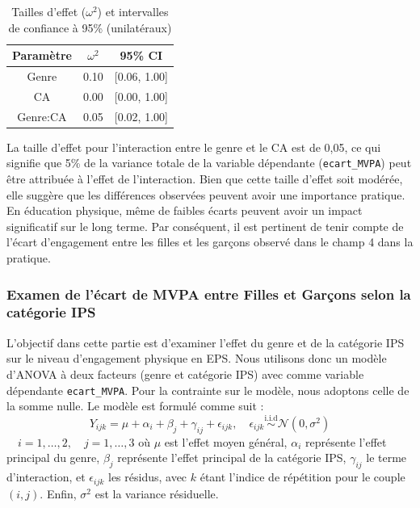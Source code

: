 \documentclass[12pt,a4paper]{article}
\begin{document}
\begin{enumerate}[label=\textbf{\alph*})]
\begin{table}[H]
	\centering
	\caption{Tailles d'effet ($\omega^2$) et intervalles de confiance à 95\% (unilatéraux)}
	\begin{tabular}{ccc}
		\toprule
		Paramètre & $\omega^2$ & 95\% CI \\
		\midrule
		Genre & 0.10 & [0.06, 1.00] \\
		CA & 0.00 & [0.00, 1.00] \\
		Genre:CA & 0.05 & [0.02, 1.00] \\
		\bottomrule
	\end{tabular}
	\label{table:effect_size_2}
\end{table}

La taille d'effet pour l'interaction entre le genre et le CA est de 0,05, ce qui signifie que 5\% de la variance totale de la variable dépendante (\texttt{ecart\_MVPA}) peut être attribuée à l'effet de l'interaction. Bien que cette taille d'effet soit modérée, elle suggère que les différences observées peuvent avoir une importance pratique. En éducation physique, même de faibles écarts peuvent avoir un impact significatif sur le long terme. Par conséquent, il est pertinent de tenir compte de l'écart d'engagement entre les filles et les garçons observé dans le champ 4 dans la pratique.

\end{enumerate}

\subsubsection{Examen de l'écart de MVPA entre Filles et Garçons selon la catégorie IPS}
L'objectif dans cette partie est d'examiner l'effet du genre et de la catégorie IPS sur le niveau d'engagement physique en EPS. Nous utilisons donc un modèle d'ANOVA à deux facteurs (genre et catégorie IPS) avec comme variable dépendante \texttt{ecart\_MVPA}. Pour la contrainte sur le modèle, nous adoptons celle de la somme nulle. Le modèle est formulé comme suit :
\begin{equation}
	Y_{ijk} = \mu + \alpha_i + \beta_j + \gamma_{ij} + \epsilon_{ijk},\quad \epsilon_{ijk} \overset{\text{i.i.d}}{\sim} \mathcal{N}(0,\sigma^2)\tag{M2}
\end{equation}
$\quad i = 1, \ldots, 2, \quad j = 1, \ldots, 3$
où $\mu$ est l'effet moyen général, $\alpha_i$ représente l'effet principal du genre, $\beta_j$ représente l'effet principal de la catégorie IPS, $\gamma_{ij}$ le terme d'interaction, et $\epsilon_{ijk}$ les résidus, avec $k$ étant l'indice de répétition pour le couple $(i,j)$. Enfin, $\sigma^2$ est la variance résiduelle.
\end{document}

